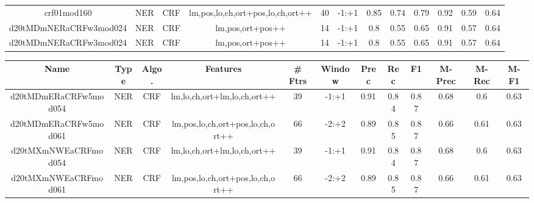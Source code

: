 \documentclass[a4paper]{article}
\begin{document}
\begin{landscape}
\begin{center}
\begin{tabular}{ |c|c|c|c|c|c|c|c|c|c|c|c|}
 	
 
 	
 		
 		\small{ crf01mod160 } & NER & CRF & lm,pos,lo,ch,ort+pos,lo,ch,ort++  &  40 &  -1:+1  &  0.85 & 0.74 & 0.79  &  0.92 & 0.59 & 0.64 \\
 		

 	
 
 	
 		
 		\small{ d20tMDmNERaCRFw3mod024 } & NER & CRF & lm,pos,ort+pos++  &  14 &  -1:+1  &  0.8 & 0.55 & 0.65  &  0.91 & 0.57 & 0.64 \\
 		

 	
 
 	
 		
 		\small{ d20tMDmNERaCRFw3mod024 } & NER & CRF & lm,pos,ort+pos++  &  14 &  -1:+1  &  0.8 & 0.55 & 0.65  &  0.91 & 0.57 & 0.64 \\
 		
 \hline
\end{tabular}
\end{center}




\begin{center}
\begin{tabular}{ |c|c|c|c|c|c|c|c|c|c|c|c|} 
 \hline
 	Name & Type & Algo. & Features & \# Ftrs & Window & Prec & Rec & F1 & M-Prec & M-Rec & M-F1\\
 \hline

 		

 	
 
 	
 		
 		\small{ d20tMDmERaCRFw5mod054 } & NER & CRF & lm,lo,ch,ort+lm,lo,ch,ort++  &  39 &  -1:+1  &  0.91 & 0.84 & 0.87  &  0.68 & 0.6 & 0.63 \\
 		

 	
 
 	
 		
 		\small{ d20tMDmERaCRFw5mod061 } & NER & CRF & lm,pos,lo,ch,ort+pos,lo,ch,ort++  &  66 &  -2:+2  &  0.89 & 0.85 & 0.87  &  0.66 & 0.61 & 0.63 \\
 		

 	
 
 	
 		
 		\small{ d20tMXmNWEaCRFmod054 } & NER & CRF & lm,lo,ch,ort+lm,lo,ch,ort++  &  39 &  -1:+1  &  0.91 & 0.84 & 0.87  &  0.68 & 0.6 & 0.63 \\
 		

 	
 
 	
 		
 		\small{ d20tMXmNWEaCRFmod061 } & NER & CRF & lm,pos,lo,ch,ort+pos,lo,ch,ort++  &  66 &  -2:+2  &  0.89 & 0.85 & 0.87  &  0.66 & 0.61 & 0.63 \\
 		


\end{tabular}
\end{center}
\end{landscape}
\end{document}
